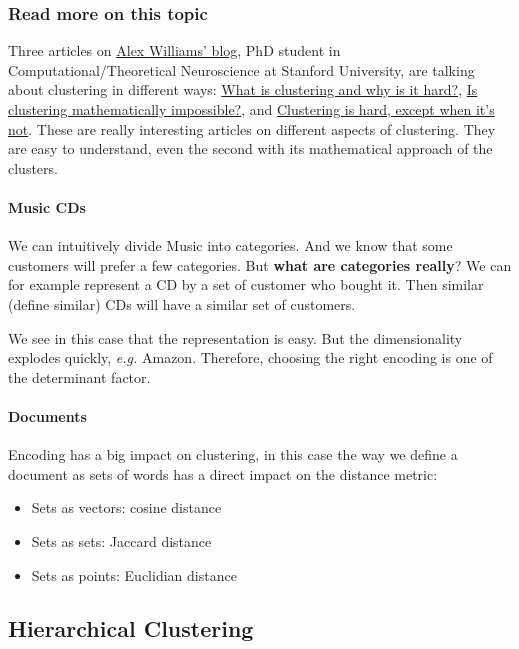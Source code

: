 \subsubsection{Read more on this topic}

Three articles on \href{http://alexhwilliams.info/itsneuronalblog/}{Alex Williams' blog}, PhD student in Computational/Theoretical Neuroscience at Stanford University, are talking about clustering in different ways: \href{http://alexhwilliams.info/itsneuronalblog/2015/09/11/clustering1/}{What is clustering and why is it hard?}, \href{http://alexhwilliams.info/itsneuronalblog/2015/10/01/clustering2/}{Is clustering mathematically impossible?}, and \href{http://alexhwilliams.info/itsneuronalblog/2015/11/18/clustering-is-easy/}{Clustering is hard, except when it's not}. These are really interesting articles on different aspects of clustering. They are easy to understand, even the second with its mathematical approach of the clusters.

\paragraph{Music CDs}

We can intuitively divide Music into categories. And we know that some customers will prefer a few categories. But {\bf what are categories really}? We can for example represent a CD by a set of customer who bought it. Then similar (define similar) CDs will have a similar set of customers.

We see in this case that the representation is easy. But the dimensionality explodes quickly, {\it e.g.} Amazon. Therefore, choosing the right encoding is one of the determinant factor.

\paragraph{Documents}

Encoding has a big impact on clustering, in this case the way we define a document as sets of words has a direct impact on the distance metric:
\begin{itemize}
	\item Sets as vectors: cosine distance
	\item Sets as sets: Jaccard distance
	\item Sets as points: Euclidian distance
\end{itemize}

\subsection{Hierarchical Clustering}

